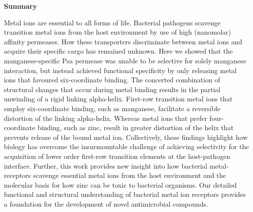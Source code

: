 \textbf{Summary}

Metal ions are essential to all forms of life. Bacterial pathogens scavenge transition metal ions from the host environment by use of high (nanomolar) affinity permeases. How these transporters discriminate between metal ions and acquire their specific cargo has remained unknown. Here we showed that the manganese-specific Psa permease was unable to be selective for solely manganese interaction, but instead achieved functional specificity by only releasing metal ions that favoured six-coordinate binding. The concerted combination of structural changes that occur during metal binding results in the partial unwinding of a rigid linking alpha-helix. First-row transition metal ions that employ six-coordinate binding, such as manganese, facilitate a reversible distortion of the linking alpha-helix. Whereas metal ions that prefer four-coordinate binding, such as zinc, result in greater distortion of the helix that prevents release of the bound metal ion. Collectively, these findings highlight how biology has overcome the insurmountable challenge of achieving selectivity for the acquisition of lower order first-row transition elements at the host-pathogen interface.  Further, this work provides new insight into how bacterial metal-receptors scavenge essential metal ions from the host environment and the molecular basis for how zinc can be toxic to bacterial organisms. Our detailed functional and structural understanding of bacterial metal ion receptors provides a foundation for the development of novel antimicrobial compounds. 